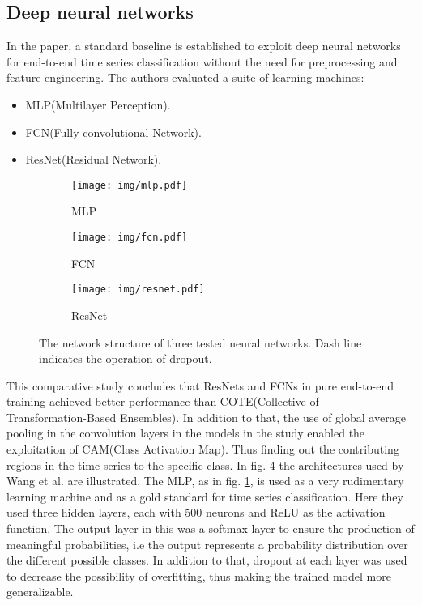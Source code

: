 \subsection{Deep neural networks}\label{subsec:dnn}
In the paper\cite{yang2019time}, a standard baseline is established to exploit deep neural networks for end-to-end time series classification without the need for preprocessing and feature engineering. The authors evaluated a suite of learning machines:
\begin{itemize}
	\item MLP(Multilayer Perception).
	\item FCN(Fully convolutional Network).
	\item ResNet(Residual Network).
\end{itemize}
\begin{figure}
	\centering
	\begin{subfigure}[b]{0.25\textwidth}
		\centering
		\texttt{[image: img/mlp.pdf]}
		\caption{MLP}
		\label{fig:wang2017timemlp}
	\end{subfigure}
	\hfill
	\begin{subfigure}[b]{0.25\textwidth}
		\centering
		\texttt{[image: img/fcn.pdf]}
		\caption{FCN}
		\label{fig:wang2017timefcn}
	\end{subfigure}
	\hfill
	\begin{subfigure}[b]{0.3\textwidth}
		\centering
		\texttt{[image: img/resnet.pdf]}
		\caption{ResNet}
		\label{fig:wang2017timeresnet}
	\end{subfigure}
	\caption{The network structure of three tested neural networks. Dash line indicates the operation of dropout\cite{wang2017time}.}
	\label{fig:wang2017time}
\end{figure}
This comparative study concludes that ResNets and FCNs in pure end-to-end training achieved better performance than COTE(Collective of \\Transformation-Based Ensembles)\cite{2015TSClassificationCOTE}. In addition to that, the use of global average pooling in the convolution layers in the models in the study enabled the exploitation of CAM(Class Activation Map). Thus finding out the contributing regions in the time series to the specific class\cite{wang2017time}. In fig. \ref{fig:wang2017time} the architectures used by Wang et al. are illustrated.\newline
The MLP, as in fig. \ref{fig:wang2017timemlp}, is used as a very rudimentary learning machine and as a gold standard for time series classification. Here they used three hidden layers, each with 500 neurons and ReLU as the activation function. The output layer in this was a softmax layer to ensure the production of meaningful probabilities, i.e the output represents a probability distribution over the different possible classes.\cite{wang2017time} In addition to that, dropout at each layer was used to decrease the possibility of overfitting, thus making the trained model more generalizable.\newline
